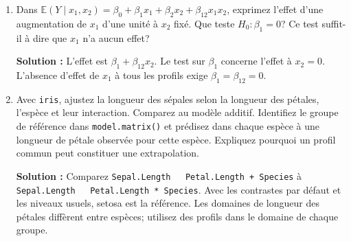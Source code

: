 \documentclass[letterpaper,11pt]{article}
\newcommand{\esp}{\mathbb{E}}
\newcommand{\prof}[1]{\ifdefined\avecsolutions\par{\color{blue}\textbf{Solution :} #1}\par\fi}
\begin{document}
\begin{enumerate}[leftmargin=*,wide,label=\bfseries Exercice \arabic*:]
\prof{$F=((500-350)/3)/(350/52)=7{,}429$. On rejette le parallélisme. On conserve les effets principaux du lot et de la concentration pour respecter la hiérarchie.}
\item Dans $\esp(Y\mid x_1,x_2)=\beta_0+\beta_1x_1+\beta_2x_2+\beta_{12}x_1x_2$, exprimez l'effet d'une augmentation de $x_1$ d'une unité à $x_2$ fixé. Que teste $H_0:\beta_1=0$? Ce test suffit-il à dire que $x_1$ n'a aucun effet?
\prof{L'effet est $\beta_1+\beta_{12}x_2$. Le test sur $\beta_1$ concerne l'effet à $x_2=0$. L'absence d'effet de $x_1$ à tous les profils exige $\beta_1=\beta_{12}=0$.}
\item Avec \texttt{iris}, ajustez la longueur des sépales selon la longueur des pétales, l'espèce et leur interaction. Comparez au modèle additif. Identifiez le groupe de référence dans \texttt{model.matrix()} et prédisez dans chaque espèce à une longueur de pétale observée pour cette espèce. Expliquez pourquoi un profil commun peut constituer une extrapolation.
\prof{Comparez \texttt{Sepal.Length \string~ Petal.Length + Species} à \texttt{Sepal.Length \string~ Petal.Length * Species}. Avec les contrastes par défaut et les niveaux usuels, setosa est la référence. Les domaines de longueur des pétales diffèrent entre espèces; utilisez des profils dans le domaine de chaque groupe.}
\end{enumerate}
\end{document}
